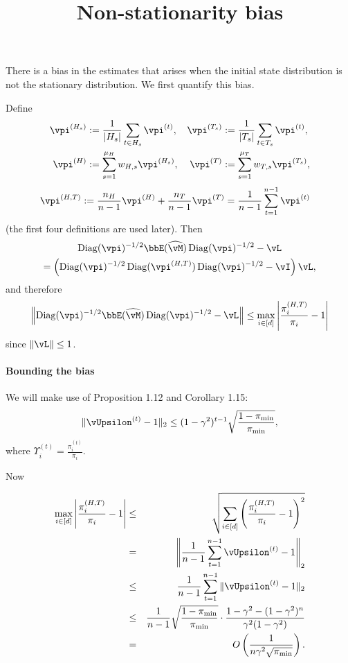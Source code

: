 \documentclass[11pt]{article}
\title{Non-stationarity bias}
\DeclareMathOperator{\Diag}{Diag}
\newcommand\wh{\ensuremath{\widehat}}
\theoremstyle{remark}
\theoremstyle{definition}
\newcommand\norm[1]{\|#1\|}
\newcommand\Parens[1]{\left(#1\right)}
\newcommand\Norm[1]{\left\|#1\right\|}
\newcommand\Abs[1]{\left|#1\right|}
\newcommand{\beq}{\begin{eqnarray*}}
\newcommand{\eeq}{\end{eqnarray*}}
\newcommand{\beqn}{\begin{eqnarray}}
\newcommand{\eeqn}{\end{eqnarray}}
\begin{document}
\maketitle

There is a bias in the estimates that arises when the initial state
distribution is not the stationary distribution.
We first quantify this bias.

Define
\begin{align*}
  \vpi^{(H_s)} & := \frac1{|H_s|} \sum_{t \in H_s} \vpi^{(t)} ,
  & \vpi^{(T_s)} & := \frac1{|T_s|} \sum_{t \in T_s} \vpi^{(t)} , \\
  \vpi^{(H)} & := \sum_{s=1}^{\mu_H} w_{H,s} \vpi^{(H_s)} ,
  & \vpi^{(T)} & := \sum_{s=1}^{\mu_T} w_{T,s} \vpi^{(T_s)} ,
\end{align*}
\begin{align*}
  \vpi^{(H,T)} & := \frac{n_H}{n-1} \vpi^{(H)} + \frac{n_T}{n-1}
  \vpi^{(T)}
  = \frac1{n-1} \sum_{t=1}^{n-1} \vpi^{(t)}
\end{align*}
(the first four definitions are used later).
Then
\begin{multline*}
  \Diag(\vpi)^{-1/2}\bbE(\wh\vM)\Diag(\vpi)^{-1/2} - \vL
  \\
  =
  \Parens{
    \Diag(\vpi)^{-1/2} \Diag(\vpi^{(H,T)}) \Diag(\vpi)^{-1/2} - \vI
  } \vL
  ,
\end{multline*}
and therefore
\[
  \Norm{\Diag(\vpi)^{-1/2}\bbE(\wh\vM)\Diag(\vpi)^{-1/2} - \vL}
  \leq \max_{i \in [d]} \Abs{ \frac{\pi_i^{(H,T)}}{\pi_i} - 1 }
\]
since $\norm{\vL} \leq 1$.




\paragraph{Bounding the bias}
We will make use of \citet{MoTe06} Proposition 1.12 and Corollary 1.15:
\beqn
\label{eq:L2-contraction}
\norm{
\vUpsilon^{(t)}
-1
}_2 \le 
(1-\gamma^2)^{t-1}\sqrt{\frac{1-\pi_{\min}}{\pi_{\min}}},
\eeqn
where $\Upsilon_i^{(t)}=\frac{\pi_i^{(t)}}{\pi_i}$.




Now

\beq
\max_{i \in [d]} \Abs{ \frac{\pi_i^{(H,T)}}{\pi_i} - 1 }
&\le&
\sqrt{\sum_{i\in[d]}
\Parens{ \frac{\pi_i^{(H,T)}}{\pi_i} - 1 }^2
}\\
&=&
\Norm{ 
\frac1{n-1} \sum_{t=1}^{n-1} 
\vUpsilon^{(t)}
-1
}_2
\\
&\le&
\frac1{n-1}
\sum_{t=1}^{n-1}
\norm{
\vUpsilon^{(t)}
-1
}_2
\\
&\le&
\frac1{n-1}
\sqrt{\frac{1-\pi_{\min}}{\pi_{\min}}}
\cdot
\frac{1-\gamma^2-(1-\gamma^2)^n}{\gamma^2(1-\gamma^2)}
\\
&=&
O\Parens{ \frac1{n\gamma^2\sqrt{\pi_{\min}}}}
.
\eeq
\end{document}
